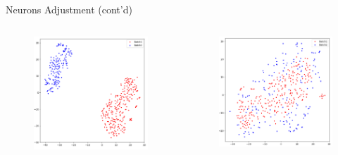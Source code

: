 \documentclass{beamer}
\begin{document}
\begin{frame}{Neurons Adjustment (cont'd)}
  \begin{columns}
    \begin{column}[t]{.48\textwidth}
      \begin{figure}[ht]
        \centering
        \includegraphics[width=1.0\textwidth,height=0.7\textheight]{figures/tsne_before.png}
        \caption*{\label{fig:tsne-before}}
      \end{figure}
    \end{column}
    \begin{column}[t]{.48\textwidth}
      \begin{figure}[ht]
        \centering
        \includegraphics[width=1.0\textwidth,height=0.7\textheight]{figures/tsne_after.png}

\end{figure}
\end{column}
\end{columns}
\end{frame}
\end{document}
